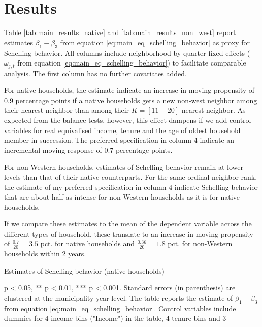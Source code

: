 \documentclass[../main.tex]{subfiles}
\begin{document}
\section{Results}
\label{sec:results}

Table \ref{tab:main_results_native} and \ref{tab:main_results_non_west} report estimates $\beta_1-\beta_3$ from equation \ref{eq:main_eq_schelling_behavior} as proxy for Schelling behavior. All columns include neighborhood-by-quarter fixed effects ($\omega_{j,t}$ from equation \ref{eq:main_eq_schelling_behavior}) to facilitate comparable analysis. The first column has no further covariates added. 

For native households, the estimate indicate an increase in moving propensity of 0.9 percentage points if a native households gets a new non-west neighbor among their nearest neighbor than among their $K=[11-20]$-nearest neighbor. As expected from the balance tests, however, this effect dampens if we add control variables for real equivalised income, tenure and the age of oldest household member in succession. The preferred specification in column 4 indicate an incremental moving response of 0.7 percentage points. 

For non-Western households, estimates of Schelling behavior remain at lower levels than that of their native counterparts. For the same ordinal neighbor rank, the estimate of my preferred specification in column 4 indicate Schelling behavior that are about half as intense for non-Western households as it is for native households. 

If we compare these estimates to the mean of the dependent variable across the different types of household, these translate to an increase in moving propensity of $\frac{0.7}{20} = 3.5$ pct. for native households and $\frac{0.36}{20}=1.8$ pct. for non-Western households within 2 years. 

\begin{table}[H]
    \caption{Estimates of Schelling behavior (native households)}
    \label{tab:main_results_native}
    \begin{threeparttable}
            
    \begin{tablenotes}[flushleft]
    \item \scriptsize * p < 0.05, ** p < 0.01, *** p < 0.001. Standard errors (in parenthesis) are clustered at the municipality-year level. The table reports the estimate of $\beta_1 - \beta_3$ from equation \ref{eq:main_eq_schelling_behavior}. Control variables include dummies for 4 income bins ("Income") in the table, 4 tenure bins and 3 
    \end{tablenotes}
    \end{threeparttable}
\end{table}
\end{document}
